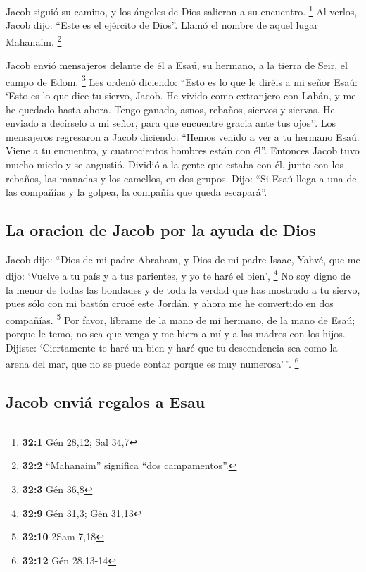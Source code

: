 \begin{paracol}{2}
 Jacob siguió su camino, y los ángeles de Dios salieron a
su encuentro. \footnote{\textbf{32:1} Gén 28,12; Sal 34,7}
 Al verlos, Jacob dijo: ``Este es el ejército de Dios''.
Llamó el nombre de aquel lugar Mahanaim. \footnote{\textbf{32:2}
  ``Mahanaim'' significa ``dos campamentos''.}

 Jacob envió mensajeros delante de él a Esaú, su hermano,
a la tierra de Seir, el campo de Edom. \footnote{\textbf{32:3} Gén 36,8}
 Les ordenó diciendo: ``Esto es lo que le diréis a mi
señor Esaú: `Esto es lo que dice tu siervo, Jacob. He vivido como
extranjero con Labán, y me he quedado hasta ahora.  Tengo
ganado, asnos, rebaños, siervos y siervas. He enviado a decírselo a mi
señor, para que encuentre gracia ante tus ojos''.  Los
mensajeros regresaron a Jacob diciendo: ``Hemos venido a ver a tu
hermano Esaú. Viene a tu encuentro, y cuatrocientos hombres están con
él''.  Entonces Jacob tuvo mucho miedo y se angustió.
Dividió a la gente que estaba con él, junto con los rebaños, las manadas
y los camellos, en dos grupos.  Dijo: ``Si Esaú llega a
una de las compañías y la golpea, la compañía que queda escapará''.

\hypertarget{la-oracion-de-jacob-por-la-ayuda-de-dios}{%
\subsection{La oracion de Jacob por la ayuda de
Dios}\label{la-oracion-de-jacob-por-la-ayuda-de-dios}}

 Jacob dijo: ``Dios de mi padre Abraham, y Dios de mi
padre Isaac, Yahvé, que me dijo: `Vuelve a tu país y a tus parientes, y
yo te haré el bien', \footnote{\textbf{32:9} Gén 31,3; Gén 31,13}
 No soy digno de la menor de todas las bondades y de toda
la verdad que has mostrado a tu siervo, pues sólo con mi bastón crucé
este Jordán, y ahora me he convertido en dos compañías. \footnote{\textbf{32:10}
  2Sam 7,18}  Por favor, líbrame de la mano de mi
hermano, de la mano de Esaú; porque le temo, no sea que venga y me hiera
a mí y a las madres con los hijos.  Dijiste: `Ciertamente
te haré un bien y haré que tu descendencia sea como la arena del mar,
que no se puede contar porque es muy numerosa'\,''. \footnote{\textbf{32:12}
  Gén 28,13-14}

\hypertarget{jacob-enviuxe1-regalos-a-esau}{%
\subsection{Jacob enviá regalos a
Esau}\label{jacob-enviuxe1-regalos-a-esau}}


\end{paracol}
